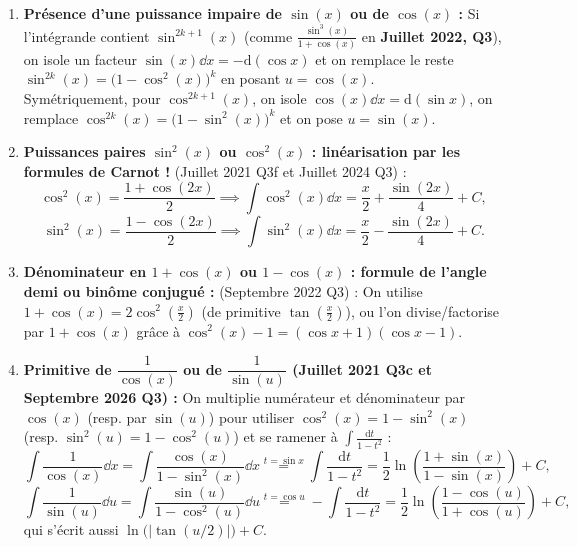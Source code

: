 \begin{theoreme}
\begin{enumerate}
    \item \textbf{Présence d'une puissance impaire de $\sin(x)$ ou de $\cos(x)$ :}
    Si l'intégrande contient $\sin^{2k+1}(x)$ (comme $\frac{\sin^3(x)}{1+\cos(x)}$ en \textbf{Juillet 2022, Q3}), on isole un facteur $\sin(x)\dd x = -\mathrm{d}(\cos x)$ et on remplace le reste $\sin^{2k}(x) = \bigl(1 - \cos^2(x)\bigr)^k$ en posant $\boxed{u = \cos(x)}$.\\
    Symétriquement, pour $\cos^{2k+1}(x)$, on isole $\cos(x)\dd x = \mathrm{d}(\sin x)$, on remplace $\cos^{2k}(x) = \bigl(1 - \sin^2(x)\bigr)^k$ et on pose $\boxed{u = \sin(x)}$.
    \item \textbf{Puissances paires $\sin^2(x)$ ou $\cos^2(x)$ : linéarisation par les formules de Carnot !}
    (Juillet 2021 Q3f et Juillet 2024 Q3) :
    \[
        \boxed{\cos^2(x) = \frac{1 + \cos(2x)}{2} \implies \int \cos^2(x)\dd x = \frac{x}{2} + \frac{\sin(2x)}{4} + C},
    \]
    \[
        \boxed{\sin^2(x) = \frac{1 - \cos(2x)}{2} \implies \int \sin^2(x)\dd x = \frac{x}{2} - \frac{\sin(2x)}{4} + C}.
    \]
    \item \textbf{Dénominateur en $1 + \cos(x)$ ou $1 - \cos(x)$ : formule de l'angle demi ou binôme conjugué :}
    (Septembre 2022 Q3) : On utilise $1 + \cos(x) = 2\cos^2\left(\frac{x}{2}\right)$ (de primitive $\tan\left(\frac{x}{2}\right)$), ou l'on divise/factorise par $1+\cos(x)$ grâce à $\cos^2(x) - 1 = (\cos x + 1)(\cos x - 1)$.
    \item \textbf{Primitive de $\dfrac{1}{\cos(x)}$ ou de $\dfrac{1}{\sin(u)}$ (Juillet 2021 Q3c et Septembre 2026 Q3) :}
    On multiplie numérateur et dénominateur par $\cos(x)$ (resp. par $\sin(u)$) pour utiliser $\cos^2(x) = 1 - \sin^2(x)$ (resp. $\sin^2(u) = 1 - \cos^2(u)$) et se ramener à $\int \frac{\mathrm{d}t}{1 - t^2}$ :
    \[
        \int \frac{1}{\cos(x)}\dd x = \int \frac{\cos(x)}{1 - \sin^2(x)}\dd x \stackrel{t=\sin x}{=} \int \frac{\mathrm{d}t}{1 - t^2} = \boxed{\frac{1}{2}\ln\left(\frac{1 + \sin(x)}{1 - \sin(x)}\right) + C},
    \]
    \[
        \int \frac{1}{\sin(u)}\dd u = \int \frac{\sin(u)}{1 - \cos^2(u)}\dd u \stackrel{t=\cos u}{=} -\int \frac{\mathrm{d}t}{1 - t^2} = \boxed{\frac{1}{2}\ln\left(\frac{1 - \cos(u)}{1 + \cos(u)}\right) + C},
    \]
    qui s'écrit aussi $\ln\bigl(|\tan(u/2)|\bigr) + C$.
\end{enumerate}
\end{theoreme}

